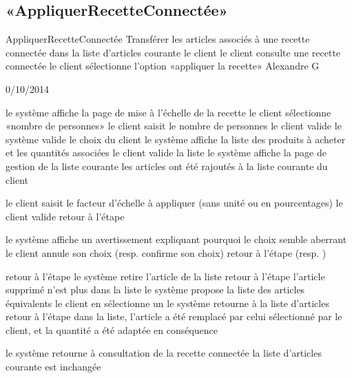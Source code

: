 \subsection{«AppliquerRecetteConnectée»}

\startCU
\nom AppliquerRecetteConnectée
\but Transférer les articles associés à une recette connectée dans la liste d'articles courante
\acteur le client
\precondition le client consulte une recette connectée 
\declenchement le client sélectionne l'option «appliquer la recette»
\auteur Alexandre G
\date 30/10/2014

\nominal %
\startnominal
\etape[DEBUT] le système affiche la page de mise à l'échelle de la recette
\etape[ZOOM] le client sélectionne «nombre de personnes» 
\etape le client saisit le nombre de personnes
\etape le client valide
\etape[VALIDATION] le système valide le choix du client
\etape[AFFICHAGE] le système affiche la liste des produits à acheter et les quantités associées
\etape[MODIFS] le client valide la liste
\etape le système affiche la page de gestion de la liste courante
\stopnominal
\postcondition les articles ont été rajoutés à la liste courante du client

\alternatifs 
\startalternatif[ZOOM] 
  \etape le client saisit le facteur d'échelle à appliquer (sans unité ou en pourcentages)
  \etape le client valide
  \etape retour à l'étape \in[VALIDATION]
\stopcondition
\stopalternatif

\startalternatif[VALIDATION] 
  \etape le système affiche un avertissement expliquant pourquoi le choix semble aberrant
  \etape le client annule son choix (resp. confirme son choix)
  \etape retour à l'étape \in[DEBUT] (resp. \in[AFFICHAGE])
\stopcondition
\stopalternatif

\startalternatif[MODIFS] 
  \etape retour à l'étape \in[DEBUT]
\stopcondition
{} 
  \etape le système retire l'article de la liste
  \etape retour à l'étape \in[MODIFS]
\stopcondition
\postcondition l'article supprimé n'est plus dans la liste
  \etape le système propose la liste des articles équivalents
  \etape le client en sélectionne un
  \etape le système retourne à la liste d'articles
  \etape retour à l'étape \in[MODIFS]
\stopcondition
\postcondition dans la liste, l'article a été remplacé par celui sélectionné par le client, et la quantité a été adaptée en conséquence
\stopalternatif

\exception 
\startalternatif[ZOOM] 
  \etape le système retourne à consultation de la recette connectée
\stopcondition
\postcondition la liste d'articles courante est inchangée
\stopalternatif
\stopCU

